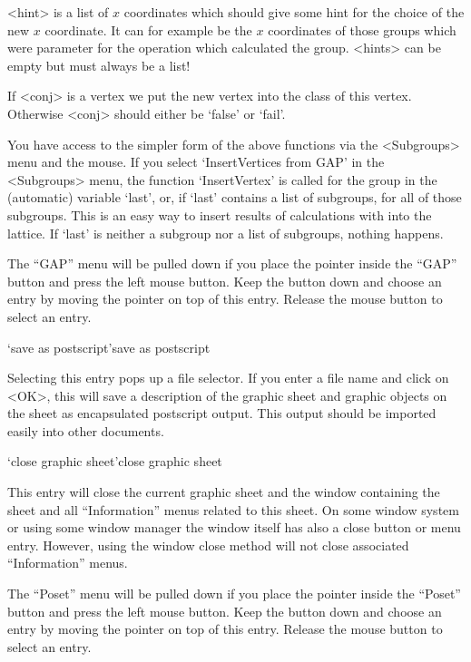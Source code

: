 <hint> is a list of $x$ coordinates which should give some hint for
the choice of the new $x$ coordinate. It can for example be the $x$
coordinates of those groups which were parameter for the operation
which calculated the group. <hints> can be empty but must always be a
list!

If <conj> is a vertex we put the new vertex into the class of this
vertex.  Otherwise <conj> should either be `false' or `fail'.

You have access to the simpler form of the above functions via the
<Subgroups> menu and the mouse. If you select 
`InsertVertices from GAP'
in the <Subgroups> menu, the function `InsertVertex' is called 
for the group in the (automatic) variable `last', or, if `last'
contains a list of subgroups, for all of those subgroups. This is an
easy way to insert results of calculations with {\GAP} into the
lattice. If `last' is neither a subgroup nor a list of subgroups,
nothing happens.



The ``GAP'' menu will  be pulled down if  you place the pointer inside  the
``GAP'' button  and press the left mouse  button.  Keep the button down and
choose an entry by moving the pointer on  top of this entry.  Release the
mouse button to select an entry.

\>`save as postscript'{save as postscript}

Selecting this entry pops up a file  selector.  If you  enter a file name
and click on <OK>, this will save a  description of the graphic sheet and
graphic objects on  the sheet as encapsulated postscript  output. This
output should be imported easily into other documents.

\>`close graphic sheet'{close graphic sheet}

This entry will close the current graphic sheet and the window containing
the sheet  and all  ``Information'' menus related  to  this sheet.  On some
window system or using  some window manager the window  itself has also a
close button or menu entry.  However,  using the window close method will
not close associated ``Information'' menus.



The ``Poset'' menu will be pulled down if you place the pointer inside the
``Poset'' button and  press the left mouse  button.  Keep  the button down
and choose an entry by moving the pointer on top of  this entry.  Release
the mouse button to select an entry.

